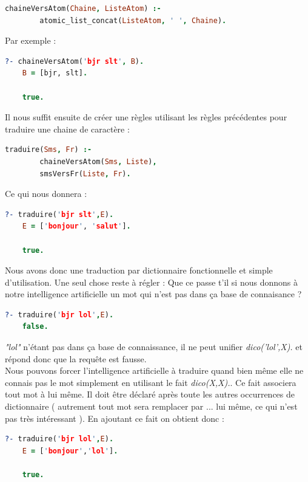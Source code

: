 \documentclass[11pt]{report}
\begin{document}
	\begin{lstlisting}[language=Prolog]
	chaineVersAtom(Chaine, ListeAtom) :-
		atomic_list_concat(ListeAtom, ' ', Chaine).
	\end{lstlisting}
	
	Par exemple :
	
	\begin{lstlisting}[language=Prolog]
	?- chaineVersAtom('bjr slt', B).
	B = [bjr, slt].
	
	true.
	\end{lstlisting}
	
	Il nous suffit ensuite de créer une règles utilisant les règles précédentes pour traduire une chaine de caractère :
	
	\begin{lstlisting}[language=Prolog]
	traduire(Sms, Fr) :-
		chaineVersAtom(Sms, Liste),
		smsVersFr(Liste, Fr).
	\end{lstlisting}
	
	Ce qui nous donnera :
	
	\begin{lstlisting}[language=Prolog]
	?- traduire('bjr slt',E).
	E = ['bonjour', 'salut'].
	
	true.
	\end{lstlisting}
	
	Nous avons donc une traduction par dictionnaire fonctionnelle et simple d'utilisation. Une seul chose reste à régler : Que ce passe t'il si nous donnons à notre intelligence artificielle un mot qui n'est pas dans ça base de connaisance ?
	
	\begin{lstlisting}[language=Prolog]
	?- traduire('bjr lol',E).
	false.
	\end{lstlisting}
	
	{\em "lol"} n'étant pas dans ça base de connaissance, il ne peut unifier {\em dico('lol',X).} et répond donc que la requête est fausse.\\
	Nous pouvons forcer l'intelligence artificielle à traduire quand bien même elle ne connais pas le mot simplement en utilisant le fait {\em dico(X,X).}. Ce fait associera tout mot à lui même. Il doit être déclaré après toute les autres occurrences de dictionnaire ( autrement tout mot sera remplacer par ... lui même, ce qui n'est pas très intéressant ). En ajoutant ce fait on obtient donc :
	
	\begin{lstlisting}[language=Prolog]
	?- traduire('bjr lol',E).
	E = ['bonjour','lol'].
	
	true.
	\end{lstlisting}
	
\end{document}
